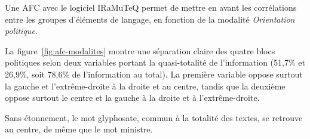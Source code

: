 \documentclass[12pt,twocolumn,landscape]{article}
\begin{document}
    Une AFC avec le logiciel IRaMuTeQ permet de mettre en avant
    les corrélations entre les groupes d'éléments de langage,
    en fonction de la modalité \textit{Orientation politique}.

    La figure~\ref{fig:afc-modalites} montre une séparation
    claire des quatre blocs politiques selon
    deux variables portant la quasi-totalité de l'information
    (51,7\% et 26,9\%, soit 78,6\% de l'information au total).
    La première variable oppose surtout la gauche et l'extrême-droite
    à la droite et au centre, tandis que la deuxième oppose
    surtout le centre et la gauche à la droite et à l'extrême-droite.

    Sans étonnement, le mot glyphosate, commun à la totalité
    des textes, se retrouve au centre, de même que le mot ministre.
\end{document}
